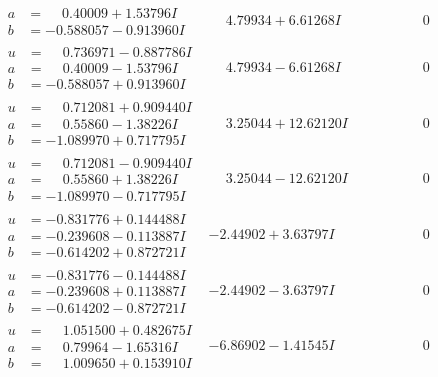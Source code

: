 \documentclass[1p]{elsarticle_modified}
\theoremstyle{definition}
\begin{document}
$$\begin{array}{c|c|c}
\begin{aligned}
a &= \phantom{-}0.40009 + 1.53796 I \\
b &= -0.588057 - 0.913960 I\end{aligned}
 & \phantom{-}4.79934 + 6.61268 I & \phantom{-0.000000 } 0 \\ \hline\begin{aligned}
u &= \phantom{-}0.736971 - 0.887786 I \\
a &= \phantom{-}0.40009 - 1.53796 I \\
b &= -0.588057 + 0.913960 I\end{aligned}
 & \phantom{-}4.79934 - 6.61268 I & \phantom{-0.000000 } 0 \\ \hline\begin{aligned}
u &= \phantom{-}0.712081 + 0.909440 I \\
a &= \phantom{-}0.55860 - 1.38226 I \\
b &= -1.089970 + 0.717795 I\end{aligned}
 & \phantom{-}3.25044 + 12.62120 I & \phantom{-0.000000 } 0 \\ \hline\begin{aligned}
u &= \phantom{-}0.712081 - 0.909440 I \\
a &= \phantom{-}0.55860 + 1.38226 I \\
b &= -1.089970 - 0.717795 I\end{aligned}
 & \phantom{-}3.25044 - 12.62120 I & \phantom{-0.000000 } 0 \\ \hline\begin{aligned}
u &= -0.831776 + 0.144488 I \\
a &= -0.239608 - 0.113887 I \\
b &= -0.614202 + 0.872721 I\end{aligned}
 & -2.44902 + 3.63797 I & \phantom{-0.000000 } 0 \\ \hline\begin{aligned}
u &= -0.831776 - 0.144488 I \\
a &= -0.239608 + 0.113887 I \\
b &= -0.614202 - 0.872721 I\end{aligned}
 & -2.44902 - 3.63797 I & \phantom{-0.000000 } 0 \\ \hline\begin{aligned}
u &= \phantom{-}1.051500 + 0.482675 I \\
a &= \phantom{-}0.79964 - 1.65316 I \\
b &= \phantom{-}1.009650 + 0.153910 I\end{aligned}
 & -6.86902 - 1.41545 I & \phantom{-0.000000 } 0\\

\end{array}$$
\end{document}

